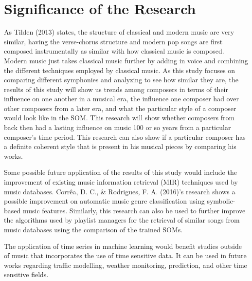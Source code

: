 \section{Significance of the Research}
\label{sec:significance}
As Tilden (2013) states, the structure of classical and modern music are very similar, having the verse-chorus structure and modern pop songs are first composed instrumentally as similar with how classical music is composed. Modern music just takes classical music further by adding in voice and combining the different techniques employed by classical music. As this study focuses on comparing different symphonies and analyzing to see how similar they are, the results of this study will show us trends among composers in terms of their influence on one another in a musical era, the influence one composer had over other composers from a later era, and what the particular style of a composer would look like in the SOM. This research will show whether composers from back then had a lasting influence on music 100 or so years from a particular composer’s time period. This research can also show if a particular composer has a definite coherent style that is present in his musical pieces by comparing his works.

Some possible future application of the results of this study would include the improvement of existing music information retrieval (MIR) techniques used by music databases. Corrêa, D. C., \& Rodrigues, F. A. (2016)’s research shows a possible improvement on automatic music genre classification using symbolic-based music features. Similarly, this research can also be used to further improve the algorithms used by playlist managers for the retrieval of similar songs from music databases using the comparison of the trained SOMs.

The application of time series in machine learning would benefit studies outside of music that incorporates the use of time sensitive data. It can be used in future works regarding traffic modelling, weather monitoring, prediction, and other time sensitive fields.

